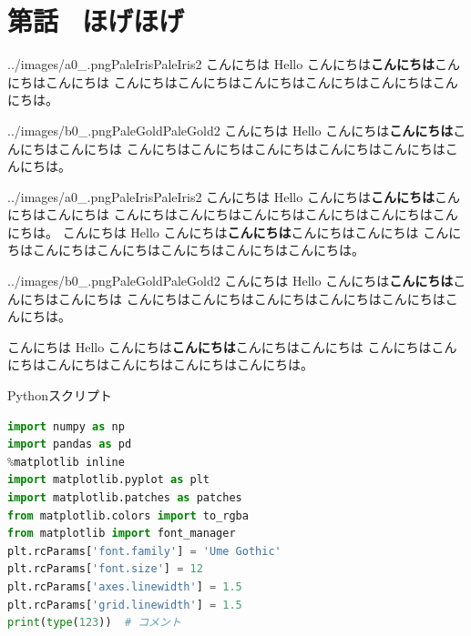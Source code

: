 \documentclass[b5paper,xelatex,ja=standard,11pt]{bxjsarticle}
\begin{document}
\renewcommand*{\mysectiontitle}{第{\themycounter}話 \, ほげほげ}
\section*{\mysectiontitle}\addcontentsline{toc}{section}{\mysectiontitle}

\begin{SERIFU}[enlarge top by=3pt]{../images/a0_.png}{PaleIris}{PaleIris2}
こんにちは Hello こんにちは{\bf こんにちは}こんにちはこんにちは
こんにちはこんにちはこんにちはこんにちはこんにちはこんにちは。
\end{SERIFU}

\begin{SERIFU}{../images/b0_.png}{PaleGold}{PaleGold2}
こんにちは Hello こんにちは{\bf こんにちは}こんにちはこんにちは
こんにちはこんにちはこんにちはこんにちはこんにちはこんにちは。
\end{SERIFU}

\begin{SERIFU}{../images/a0_.png}{PaleIris}{PaleIris2}
こんにちは Hello こんにちは{\bf こんにちは}こんにちはこんにちは
こんにちはこんにちはこんにちはこんにちはこんにちはこんにちは。
こんにちは Hello こんにちは{\bf こんにちは}こんにちはこんにちは
こんにちはこんにちはこんにちはこんにちはこんにちはこんにちは。
\end{SERIFU}

\begin{SERIFU}[enlarge bottom by=2pt]{../images/b0_.png}{PaleGold}{PaleGold2}
こんにちは Hello こんにちは{\bf こんにちは}こんにちはこんにちは
こんにちはこんにちはこんにちはこんにちはこんにちはこんにちは。
\end{SERIFU}

こんにちは Hello こんにちは{\bf こんにちは}こんにちはこんにちは
こんにちはこんにちはこんにちはこんにちはこんにちはこんにちは。

\begin{CODE}[]{Pythonスクリプト}
\begin{lstlisting}[language=python]
import numpy as np
import pandas as pd
%matplotlib inline  
import matplotlib.pyplot as plt
import matplotlib.patches as patches
from matplotlib.colors import to_rgba
from matplotlib import font_manager
plt.rcParams['font.family'] = 'Ume Gothic'
plt.rcParams['font.size'] = 12
plt.rcParams['axes.linewidth'] = 1.5
plt.rcParams['grid.linewidth'] = 1.5
print(type(123))  # コメント
\end{lstlisting}
\end{CODE}
\end{document}
